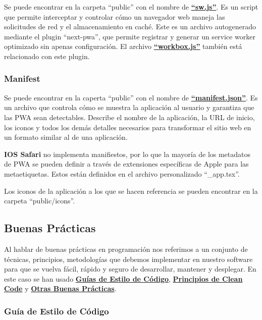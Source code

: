 \documentclass[12pt,twoside,titlepage]{report}
\begin{document}
Se puede encontrar en la carpeta ``public'' con el nombre de \href{https://github.com/alberttogoca/EarFit/blob/main/public/sw.js}{\textbf{``sw.js''}}. Es un script que permite interceptar y controlar cómo un navegador web maneja las solicitudes de red y el almacenamiento en caché. Este es un archivo autogenerado mediante el plugin ``next-pwa'', que permite registrar y generar un service worker optimizado sin apenas configuración. El archivo \href{https://github.com/alberttogoca/EarFit/blob/main/public/workbox-1846d813.js}{\textbf{``workbox.js''}} también está relacionado con este plugin.
\cite{serviceworker}

\subsubsection{Manifest}
\label{sec:manifest}

Se puede encontrar en la caperta ``public'' con el nombre de \href{https://github.com/alberttogoca/EarFit/blob/main/public/manifest.json}{\textbf{``manifest.json''}}. Es un archivo que controla cómo se muestra la aplicación al usuario y garantiza que las PWA sean detectables. Describe el nombre de la aplicación, la URL de inicio, los iconos y todos los demás detalles necesarios para transformar el sitio web en un formato similar al de una aplicación. 
\cite{manifest}

\textbf{IOS Safari} no implementa manifiestos, por lo que la mayoría de los metadatos de PWA se pueden definir a través de extensiones específicas de Apple para las metaetiquetas. Estos están definidos en el archivo personalizado ``\_app.tsx''.

Los iconos de la aplicación a los que se hacen referencia se pueden encontrar en la carpeta ``public/icons''.


\subsection{Buenas Prácticas}

Al hablar de buenas prácticas en programación nos referimos a un conjunto de técnicas, principios, metodologías que debemos implementar en nuestro software para que se vuelva fácil, rápido y seguro de desarrollar, mantener y desplegar.
En este caso se han usado \hyperref[sec:estiloCodigo]{\textbf{Guías de Estilo de Código}}, \hyperref[sec:cleancode]{\textbf{Principios de Clean Code}} y \hyperref[sec:otrasPracticas]{\textbf{Otras Buenas Prácticas}}.

\subsubsection{Guía de Estilo de Código}
\label{sec:estiloCodigo}
\end{document}
